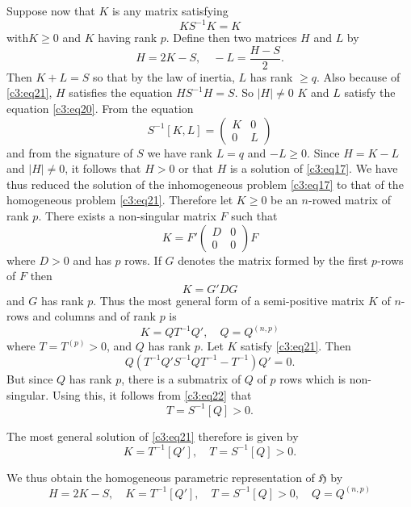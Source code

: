 Suppose now that $K$ is any matrix satisfying
\begin{equation*}
KS^{-1}K=K\tag{21}\label{c3:eq21}
\end{equation*}
with\pageoriginale $K\geq 0$ and $K$ having rank $p$. Define then two
matrices $H$ and $L$ by
$$
H=2K-S,\quad -L=\frac{H-S}{2}.
$$
Then $K+L=S$ so that by the law of inertia, $L$ has rank $\geq
q$. Also because of \eqref{c3:eq21}, $H$ satisfies the equation
$HS^{-1}H=S$. So $|H|\neq 0$ $K$ and $L$ satisfy the equation
\eqref{c3:eq20}. From the equation 
$$
S^{-1}[K,L]=
\begin{pmatrix}
K & 0\\
0 & L
\end{pmatrix}
$$
and from the signature of $S$ we have rank $L=q$ and $-L\geq 0$. Since
$H=K-L$ and $|H|\neq 0$, it follows that $H>0$ or that $H$ is a
solution of \eqref{c3:eq17}. We have thus reduced the solution of the
inhomogeneous problem \eqref{c3:eq17} to that of the homogeneous problem
\eqref{c3:eq21}. Therefore let $K\geq 0$ be an $n$-rowed matrix of rank
$p$. There exists a non-singular matrix $F$ such that
$$
K=F'
\begin{pmatrix}
D & 0\\
0 & 0
\end{pmatrix}
F
$$
where $D>0$ and has $p$ rows. If $G$ denotes the matrix formed by the
first $p$-rows of $F$ then
$$
K=G'DG
$$
and $G$ has rank $p$. Thus the most general form of a semi-positive
matrix $K$ of $n$-rows and columns and of rank $p$ is
$$
K=QT^{-1}Q',\quad Q=Q^{(n,p)}
$$
where $T=T^{(p)}>0$, and $Q$ has rank $p$. Let $K$ satisfy
\eqref{c3:eq21}. Then\pageoriginale
\begin{equation*}
Q(T^{-1}Q'S^{-1}QT^{-1}-T^{-1})Q'=0.\tag{22}\label{c3:eq22}
\end{equation*}
But since $Q$ has rank $p$, there is a submatrix of $Q$ of $p$ rows
which is non-singular. Using this, it follows from \eqref{c3:eq22} that
$$
T=S^{-1}[Q]>0.
$$

The most general solution of \eqref{c3:eq21} therefore is given by
$$
K=T^{-1}[Q'],\quad T=S^{-1}[Q]>0.
$$

We thus obtain the homogeneous parametric representation of
$\mathfrak{H}$ by
\begin{equation*}
H=2K-S,\quad K=T^{-1}[Q'],\quad T=S^{-1}[Q]>0,\quad
Q=Q^{(n,p)}\tag{23}\label{c3:eq23} 
\end{equation*}

